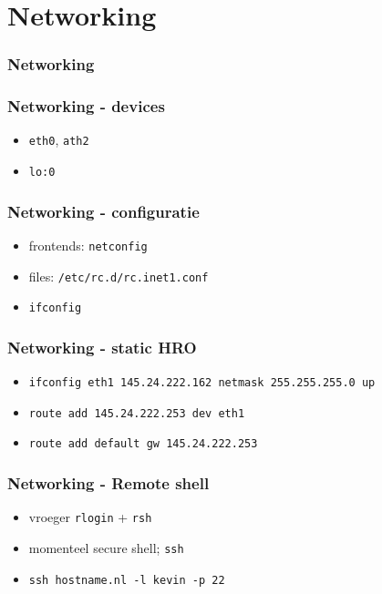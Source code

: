 \documentclass{beamer}
\begin{document}
\section{Networking}

\begin{frame}
  \frametitle{Networking}
\end{frame}

\begin{frame}
  \frametitle{Networking - devices}
  \begin{itemize}
  \item<1-> \texttt{eth0}, \texttt{ath2}
  \item<2-> \texttt{lo:0}
  \end{itemize}
\end{frame}

\begin{frame}
  \frametitle{Networking - configuratie}
  \begin{itemize}
  \item<1-> frontends: \texttt{netconfig}
  \item<2-> files: \texttt{/etc/rc.d/rc.inet1.conf}
  \item<3-> \texttt{ifconfig}
  \end{itemize}
\end{frame}

\begin{frame}
  \frametitle{Networking - static HRO}
  \begin{itemize}
  \item<1-> \texttt{ifconfig eth1 145.24.222.162 netmask 255.255.255.0 up}
  \item<2-> \texttt{route add 145.24.222.253 dev eth1}
  \item<3-> \texttt{route add default gw 145.24.222.253}
  \end{itemize}
\end{frame}

\begin{frame}
  \frametitle{Networking - Remote shell}
  \begin{itemize}
  \item<1-> vroeger \texttt{rlogin} + \texttt{rsh}
  \item<2-> momenteel secure shell; \texttt{ssh}
  \item<3-> \texttt{ssh hostname.nl -l kevin -p 22}
  \end{itemize}
\end{frame}
\end{document}
